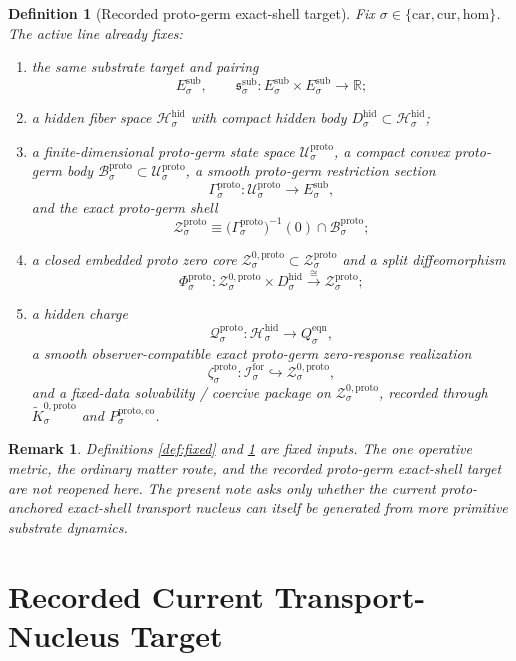 \documentclass[11pt]{article}
\newcommand{\Car}{\mathrm{car}}
\newcommand{\Cur}{\mathrm{cur}}
\newcommand{\Hom}{\mathrm{hom}}
\newcommand{\ForSpace}[1]{\mathcal I_{#1}^{\mathrm{for}}}
\newcommand{\SubTarget}[1]{E_{#1}^{\mathrm{sub}}}
\newcommand{\SubPair}[1]{\mathfrak s_{#1}^{\mathrm{sub}}}
\newcommand{\EqnTarget}[1]{Q_{#1}^{\mathrm{eqn}}}
\newcommand{\HiddenSpace}[1]{\mathcal H_{#1}^{\mathrm{hid}}}
\newcommand{\HiddenBody}[1]{D_{#1}^{\mathrm{hid}}}
\newcommand{\ProtoSpace}[1]{\mathcal U_{#1}^{\mathrm{proto}}}
\newcommand{\ProtoBody}[1]{\mathcal B_{#1}^{\mathrm{proto}}}
\newcommand{\ProtoSection}[1]{\Gamma_{#1}^{\mathrm{proto}}}
\newcommand{\ProtoShellSet}[1]{\mathcal Z_{#1}^{\mathrm{proto}}}
\newcommand{\ProtoZeroCore}[1]{\mathcal Z_{#1}^{0,\mathrm{proto}}}
\newcommand{\ProtoSplit}[1]{\Phi_{#1}^{\mathrm{proto}}}
\newcommand{\ProtoCharge}[1]{\mathcal Q_{#1}^{\mathrm{proto}}}
\newcommand{\ProtoEmbed}[1]{\zeta_{#1}^{\mathrm{proto}}}
\newcommand{\ProtoKernelCh}[1]{\widetilde K_{#1}^{0,\mathrm{proto}}}
\newcommand{\ProtoStateComp}[1]{P_{#1}^{\mathrm{proto,co}}}
\newtheorem{definition}{Definition}
\newtheorem{remark}{Remark}
\begin{document}
\begin{definition}[Recorded proto-germ exact-shell target]
\label{def:proto}
Fix \(\sigma\in\{\Car,\Cur,\Hom\}\). The active line already fixes:
\begin{enumerate}
    \item the same substrate target and pairing
    \[
    \SubTarget{\sigma},
    \qquad
    \SubPair{\sigma}:
    \SubTarget{\sigma}\times\SubTarget{\sigma}\to\mathbb R;
    \]
    \item a hidden fiber space \(\HiddenSpace{\sigma}\) with compact hidden body \(\HiddenBody{\sigma}\subset\HiddenSpace{\sigma}\);
    \item a finite-dimensional proto-germ state space \(\ProtoSpace{\sigma}\), a compact convex proto-germ body \(\ProtoBody{\sigma}\subset\ProtoSpace{\sigma}\), a smooth proto-germ restriction section
    \[
    \ProtoSection{\sigma}:\ProtoSpace{\sigma}\to\SubTarget{\sigma},
    \]
    and the exact proto-germ shell
    \[
    \ProtoShellSet{\sigma}
    \equiv
    \bigl(\ProtoSection{\sigma}\bigr)^{-1}(0)\cap\ProtoBody{\sigma};
    \]
    \item a closed embedded proto zero core \(\ProtoZeroCore{\sigma}\subset\ProtoShellSet{\sigma}\) and a split diffeomorphism
    \[
    \ProtoSplit{\sigma}:
    \ProtoZeroCore{\sigma}\times\HiddenBody{\sigma}
    \xrightarrow{\cong}
    \ProtoShellSet{\sigma};
    \]
    \item a hidden charge
    \[
    \ProtoCharge{\sigma}:\HiddenSpace{\sigma}\to\EqnTarget{\sigma},
    \]
    a smooth observer-compatible exact proto-germ zero-response realization
    \[
    \ProtoEmbed{\sigma}:\ForSpace{\sigma}\hookrightarrow\ProtoZeroCore{\sigma},
    \]
    and a fixed-data solvability / coercive package on \(\ProtoZeroCore{\sigma}\), recorded through \(\ProtoKernelCh{\sigma}\) and \(\ProtoStateComp{\sigma}\).
\end{enumerate}
\end{definition}

\begin{remark}
Definitions \ref{def:fixed} and \ref{def:proto} are fixed inputs. The one operative metric, the ordinary matter route, and the recorded proto-germ exact-shell target are not reopened here. The present note asks only whether the current proto-anchored exact-shell transport nucleus can itself be generated from more primitive substrate dynamics.
\end{remark}

\section{Recorded Current Transport-Nucleus Target}
\end{document}
